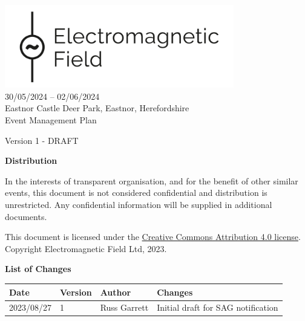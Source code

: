 

\newcommand{\st}{\textsuperscript{st} }
\newcommand{\nd}{\textsuperscript{nd} }
\renewcommand{\th}{\textsuperscript{th} }
\newcommand{\rd}{\textsuperscript{rd} }
\newcommand{\sq}{\textsuperscript{2}}




\begin{titlepage}
  \thispagestyle{empty}
  \begin{center}
    \includegraphics[width=10cm]{../resources/emf-logo.png}\\[24pt]
    {\LARGE 30/05/2024 -- 02/06/2024} \\[16pt]
    {\Large Eastnor Castle Deer Park, Eastnor, Herefordshire} \\[48pt]

    {\Large Event Management Plan}

    Version 1 - DRAFT

    \vfill

    \begin{framed}
      \textbf{Distribution}

      In the interests of transparent organisation, and for the benefit of other similar events,
      this document is not considered confidential and distribution is unrestricted.
      Any confidential information will be supplied in additional documents.

      \footnotesize{This document is licensed under the
        \href{https://creativecommons.org/licenses/by/4.0/}{Creative Commons Attribution 4.0 license}.
        Copyright Electromagnetic Field Ltd, 2023.}
    \end{framed}

    \textbf{List of Changes}
    \begin{tabular}{l | l | l | p{9cm}}
      Date       & Version & Author       & Changes                            \\
      \hline
      2023/08/27 & 1       & Russ Garrett & Initial draft for SAG notification
    \end{tabular}
  \end{center}
\end{titlepage}
\setcounter{page}{2}

\tableofcontents

\newpage



